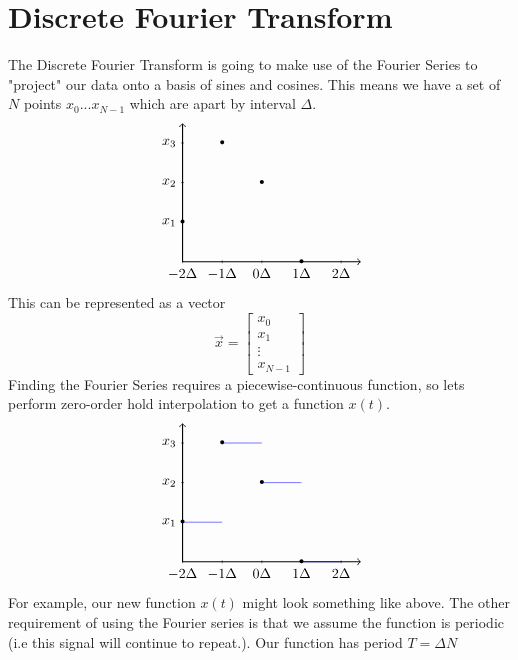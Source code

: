\documentclass{article}
\begin{document}
\section{Discrete Fourier Transform}
The Discrete Fourier Transform is going to make use of the Fourier Series to "project"
our data onto a basis of sines and cosines. This means we have a set of $N$ points $x_0...x_{N-1}$
which are apart by interval $\Delta$.
\[
    \begin{tikzpicture}
        \draw[thick,->] (0, 0) -- (4.5,0);
        \draw[thick,->] (0,0) -- (0,3.5);
        \foreach \x in {-2,-1, 0, 1, 2}
            \draw (\x+2,1pt) -- (\x + 2,-1pt) node[anchor=north] {$\x \Delta$};
        \foreach \y in {1,2,3}
            \draw (1pt,\y cm) -- (-1pt,\y cm) node[anchor=east] {$x_{\y}$};
        \foreach \Point in {(0,1), (2,2), (1,3), (3, 0)}{
            \node at \Point {\textbullet};
        }
    \end{tikzpicture}
\]
This can be represented as a vector 
\[
    \vec{x} = \left[
        \begin{array}{c}
            x_0\\
            x_1\\
            \vdots\\
            x_{N-1}
        \end{array}
    \right]
\]
Finding the Fourier Series requires a piecewise-continuous function, so lets perform zero-order hold interpolation
to get a function $x(t)$.
\[
    \begin{tikzpicture}
        \draw[thick,->] (0, 0) -- (4.5,0);
        \draw[thick,->] (0,0) -- (0,3.5);
        \foreach \x in {-2,-1, 0, 1, 2}
            \draw (\x+2,1pt) -- (\x + 2,-1pt) node[anchor=north] {$\x \Delta$};
        \foreach \y in {1,2,3}
            \draw (1pt,\y cm) -- (-1pt,\y cm) node[anchor=east] {$x_{\y}$};
        \draw[scale=1,domain=0:1,smooth,variable=\x,blue] plot ({\x},{1});
        \draw[scale=1,domain=2:3,smooth,variable=\x,blue] plot ({\x},{2});
        \draw[scale=1,domain=1:2,smooth,variable=\x,blue] plot ({\x},{3});
        \draw[scale=1,domain=3:4,smooth,variable=\x,blue] plot ({\x},{0});
        \foreach \Point in {(0,1), (2,2), (1,3), (3, 0)}{
            \node at \Point {\textbullet};
        }
    \end{tikzpicture}
\]
For example, our new function $x(t)$ might look something like above.
The other requirement of using the Fourier series is that we assume the 
function is periodic (i.e this signal will continue to repeat.). Our function 
has period $T = \Delta N$\\\\
\end{document}

